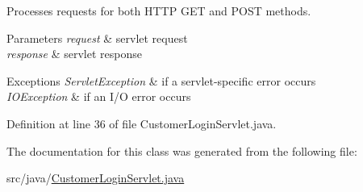Processes requests for both H\+T\+TP {\ttfamily G\+ET} and {\ttfamily P\+O\+ST} methods.


\begin{DoxyParams}{Parameters}
{\em request} & servlet request \\
\hline
{\em response} & servlet response \\
\hline
\end{DoxyParams}

\begin{DoxyExceptions}{Exceptions}
{\em Servlet\+Exception} & if a servlet-\/specific error occurs \\
\hline
{\em I\+O\+Exception} & if an I/O error occurs \\
\hline
\end{DoxyExceptions}


Definition at line 36 of file Customer\+Login\+Servlet.\+java.



The documentation for this class was generated from the following file\+:\begin{DoxyCompactItemize}
\item 
src/java/\mbox{\hyperlink{_customer_login_servlet_8java}{Customer\+Login\+Servlet.\+java}}\end{DoxyCompactItemize}
